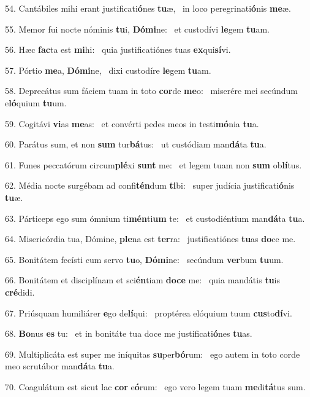 54. Cantábiles mihi erant justificati\textbf{ó}nes \textbf{tu}æ, \ast\  in loco peregrinati\textbf{ó}nis \textbf{me}æ.\

55. Memor fui nocte nóminis \textbf{tu}i, \textbf{Dó}\textbf{mi}ne: \ast\  et custodívi \textbf{le}gem \textbf{tu}am.\

56. Hæc \textbf{fac}ta est \textbf{mi}hi: \ast\  quia justificatiónes tuas \textbf{ex}qui\textbf{sí}vi.\

57. Pórtio \textbf{me}a, \textbf{Dó}\textbf{mi}ne, \ast\  dixi custodíre \textbf{le}gem \textbf{tu}am.\

58. Deprecátus sum fáciem tuam in toto \textbf{cor}de \textbf{me}o: \ast\  miserére mei secúndum e\textbf{ló}quium \textbf{tu}um.\

59. Cogitávi \textbf{vi}as \textbf{me}as: \ast\  et convérti pedes meos in testi\textbf{mó}nia \textbf{tu}a.\

60. Parátus sum, et non \textbf{sum} tur\textbf{bá}tus: \ast\  ut custódiam man\textbf{dá}ta \textbf{tu}a.\

61. Funes peccatórum circum\textbf{plé}xi \textbf{sunt} me: \ast\  et legem tuam non \textbf{sum} ob\textbf{lí}tus.\

62. Média nocte surgébam ad confi\textbf{tén}dum \textbf{ti}bi: \ast\  super judícia justificati\textbf{ó}nis \textbf{tu}æ.\

63. Párticeps ego sum ómnium ti\textbf{mén}ti\textbf{um} te: \ast\  et custodiéntium man\textbf{dá}ta \textbf{tu}a.\

64. Misericórdia tua, Dómine, \textbf{ple}na est \textbf{ter}ra: \ast\  justificatiónes \textbf{tu}as \textbf{do}ce me.\

65. Bonitátem fecísti cum servo \textbf{tu}o, \textbf{Dó}\textbf{mi}ne: \ast\  secúndum \textbf{ver}bum \textbf{tu}um.\

66. Bonitátem et disciplínam et sci\textbf{én}tiam \textbf{do}\textbf{ce} me: \ast\  quia mandátis \textbf{tu}is \textbf{cré}didi.\

67. Priúsquam humiliárer \textbf{e}go de\textbf{lí}qui: \ast\  proptérea elóquium tuum \textbf{cus}to\textbf{dí}vi.\

68. \textbf{Bo}nus \textbf{es} tu: \ast\  et in bonitáte tua doce me justificati\textbf{ó}nes \textbf{tu}as.\

69. Multiplicáta est super me iníquitas \textbf{su}per\textbf{bó}rum: \ast\  ego autem in toto corde meo scrutábor man\textbf{dá}ta \textbf{tu}a.\

70. Coagulátum est sicut lac \textbf{cor} e\textbf{ó}rum: \ast\  ego vero legem tuam \textbf{me}di\textbf{tá}tus sum.\

